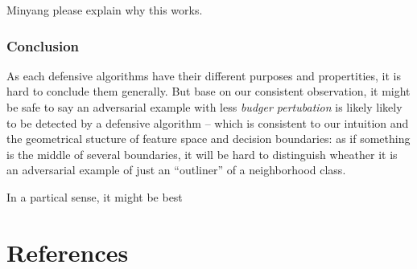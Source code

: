 \documentclass[11pt]{article}
\begin{document}
Minyang please explain why this works.

\subsubsection{Conclusion}

As each defensive algorithms have their different purposes and propertities, it is hard to conclude them generally. But base on our consistent observation, it might be safe to say an adversarial example with less \textit{budger pertubation} is likely likely to be detected by a defensive algorithm -- which is consistent to our intuition and the geometrical stucture of feature space and decision boundaries: as if something is the middle of several boundaries, it will be hard to distinguish wheather it is an adversarial example of just an ``outliner'' of a neighborhood class.

In a partical sense, it might be best

\section{References}
\nocite{*}
\raggedright


\end{document}
